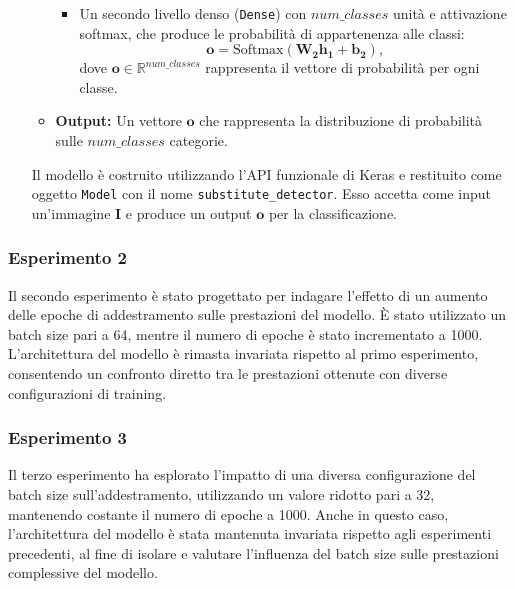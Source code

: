 \begin{itemize}
\begin{itemize}
\begin{itemize}
            \item Un secondo livello denso (\texttt{Dense}) con $num\_classes$ unità e attivazione softmax, che produce le probabilità di appartenenza alle classi:
            \[
            \mathbf{o} = \text{Softmax}(\mathbf{W_2}\mathbf{h_1} + \mathbf{b_2}),
            \]
            dove $\mathbf{o} \in \mathbb{R}^{num\_classes}$ rappresenta il vettore di probabilità per ogni classe.
        \end{itemize}
    
        \item \textbf{Output:} Un vettore $\mathbf{o}$ che rappresenta la distribuzione di probabilità sulle $num\_classes$ categorie.
    \end{itemize}
    Il modello è costruito utilizzando l'API funzionale di Keras e restituito come oggetto \texttt{Model} con il nome \texttt{substitute\_detector}. Esso accetta come input un'immagine $\mathbf{I}$ e produce un output $\mathbf{o}$ per la classificazione.

\end{itemize}

\subsubsection{Esperimento 2} 
Il secondo esperimento è stato progettato per indagare l'effetto di un aumento delle epoche di addestramento sulle prestazioni del modello. È stato utilizzato un batch size pari a 64, mentre il numero di epoche è stato incrementato a 1000. L'architettura del modello è rimasta invariata rispetto al primo esperimento, consentendo un confronto diretto tra le prestazioni ottenute con diverse configurazioni di training.

\subsubsection{Esperimento 3} 
Il terzo esperimento ha esplorato l'impatto di una diversa configurazione del batch size sull'addestramento, utilizzando un valore ridotto pari a 32, mantenendo costante il numero di epoche a 1000. Anche in questo caso, l'architettura del modello è stata mantenuta invariata rispetto agli esperimenti precedenti, al fine di isolare e valutare l'influenza del batch size sulle prestazioni complessive del modello.

